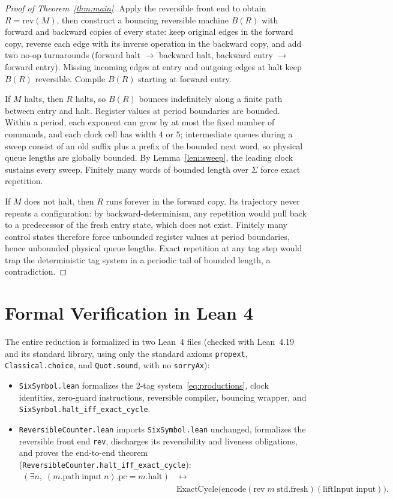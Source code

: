 \documentclass{article}
\theoremstyle{definition}
\theoremstyle{remark}
\newcommand{\ttw}[1]{\texttt{#1}}
\begin{document}
\begin{proof}[Proof of Theorem~\ref{thm:main}]
Apply the reversible front end to obtain $R = \mathrm{rev}(M)$, then construct a bouncing reversible machine $B(R)$ with forward and backward copies of every state: keep original edges in the forward copy, reverse each edge with its inverse operation in the backward copy, and add two no-op turnarounds (forward halt $\to$ backward halt, backward entry $\to$ forward entry).
Missing incoming edges at entry and outgoing edges at halt keep $B(R)$ reversible.
Compile $B(R)$ starting at forward entry.

If $M$ halts, then $R$ halts, so $B(R)$ bounces indefinitely along a finite path between entry and halt.
Register values at period boundaries are bounded.
Within a period, each exponent can grow by at most the fixed number of commands, and each clock cell has width $4$ or $5$; intermediate queues during a sweep consist of an old suffix plus a prefix of the bounded next word, so physical queue lengths are globally bounded.
By Lemma~\ref{lem:sweep}, the leading clock sustains every sweep.
Finitely many words of bounded length over $\Sigma$ force exact repetition.

If $M$ does not halt, then $R$ runs forever in the forward copy.
Its trajectory never repeats a configuration: by backward-determinism, any repetition would pull back to a predecessor of the fresh entry state, which does not exist.
Finitely many control states therefore force unbounded register values at period boundaries, hence unbounded physical queue lengths.
Exact repetition at any tag step would trap the deterministic tag system in a periodic tail of bounded length, a contradiction.
\end{proof}

\section{Formal Verification in Lean 4}

The entire reduction is formalized in two Lean~4 files (checked with Lean~4.19 and its standard library, using only the standard axioms \ttw{propext}, \ttw{Classical.choice}, and \ttw{Quot.sound}, with no \ttw{sorryAx}):
\begin{itemize}
\item \ttw{SixSymbol.lean} formalizes the 2-tag system~\eqref{eq:productions}, clock identities, zero-guard instructions, reversible compiler, bouncing wrapper, and \ttw{SixSymbol.halt\_iff\_exact\_cycle}.
\item \ttw{ReversibleCounter.lean} imports \ttw{SixSymbol.lean} unchanged, formalizes the reversible front end \ttw{rev}, discharges its reversibility and liveness obligations, and proves the end-to-end theorem (\ttw{ReversibleCounter.\allowbreak halt\_iff\_exact\_cycle}):
\begin{align*}
(\exists n,\; (m.\mathrm{path}\;\mathrm{input}\;n).\mathrm{pc} = m.\mathrm{halt})
&\;\longleftrightarrow\; \\
&\mathrm{ExactCycle}\bigl(\mathrm{encode}(\mathrm{rev}\;m\;\mathrm{std.fresh})(\mathrm{liftInput}\;\mathrm{input})\bigr).
\end{align*}
\end{itemize}
\end{document}
